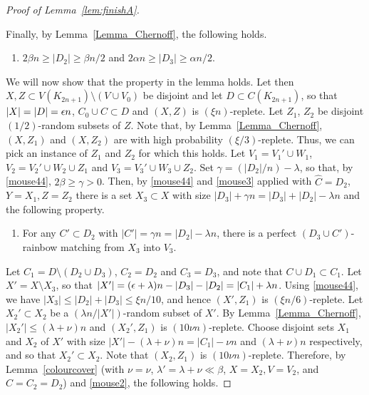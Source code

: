 \begin{proof}[Proof of Lemma~\ref{lem:finishA}]
\begin{enumerate}[label = {\bfseries \Alph{propcounter}\arabic{enumi}}]
\end{enumerate}
Finally, by Lemma~\ref{Lemma_Chernoff}, the following holds.
\begin{enumerate}[label = {\bfseries \Alph{propcounter}\arabic{enumi}}]\addtocounter{enumi}{3}
\item $2\beta n\geq |D_2|\geq \beta n/2$ and $2\alpha n\geq |D_3|\geq \alpha n/2$.\label{mouse44}
\end{enumerate}

We will now show that the property in the lemma holds.
Let then $X,Z\subset V(K_{2n+1})\setminus (V\cup V_0)$ be disjoint and let $D\subset C(K_{2n+1})$, so that $|X|=|D|=\epsilon n$, $C_0\cup C\subset D$ and $(X,Z)$ is $(\xi n)$-replete. Let $Z_1$, $Z_2$ be disjoint $(1/2)$-random subsets of $Z$. Note that, by Lemma~\ref{Lemma_Chernoff}, $(X,Z_1)$ and $(X,Z_2)$ are with high probability $(\xi/3)$-replete. Thus, we can pick an instance of $Z_1$ and $Z_2$ for which this holds. Let $V_1=V_1'\cup W_1$, $V_2=V_2'\cup W_2\cup Z_1$ and $V_3=V_3'\cup W_3\cup Z_2$.
Set $\gamma=(|D_2|/n)-\lambda$, so that, by \ref{mouse44}, $2\beta\geq \gamma>0$. Then, by \ref{mouse44} and \ref{mouse3} applied with $\hat{C}=D_2$, $Y=X_1, Z=Z_2$ there is a set $X_3\subset X$ with size $|D_3|+\gamma n=|D_3|+|D_2|-\lambda n$ and the following property.

\begin{enumerate}[label = {\bfseries \Alph{propcounter}\arabic{enumi}}]\addtocounter{enumi}{4}
\item For any $C'\subset D_2$ with $|C'|=\gamma n=|D_2|-\lambda n$, there is a perfect $(D_3\cup C')$-rainbow matching from $X_3$ into $V_3$.\label{mouse4}
\end{enumerate}

Let $C_1=D\setminus (D_2\cup D_3)$, $C_2=D_2$ and $C_3=D_3$, and note that $C\cup D_1\subset C_1$. 
Let $X'=X\setminus X_3$, so that $|X'|=(\epsilon +\lambda)n-|D_3|-|D_2|=|C_1|+\lambda n$. Using \ref{mouse44}, we have $|X_3|\leq |D_2|+|D_3|\leq \xi n/10$, and hence $(X',Z_1)$ is $(\xi n/6)$-replete.
Let $X_2'\subset X_2$ be a $(\lambda n/|X'|)$-random subset of $X'$. By Lemma~\ref{Lemma_Chernoff}, $|X_2'|\leq (\lambda+\nu)n$ and $(X_2',Z_1)$ is $(10\nu n)$-replete. Choose disjoint sets $X_1$ and $X_2$ of $X'$ with size $|X'|-(\lambda+\nu)n=|C_1|-\nu n$ and $(\lambda+\nu)n$ respectively, and so that $X_2'\subset X_2$. Note that $(X_2,Z_1)$ is $(10\nu n)$-replete. Therefore, by Lemma~\ref{colourcover} (with $\nu=\nu$, $\lambda'=\lambda+\nu \ll \beta$, $X=X_2, V=V_2$, and $C=C_2=D_2$) and \ref{mouse2}, the following holds.


\end{proof}
